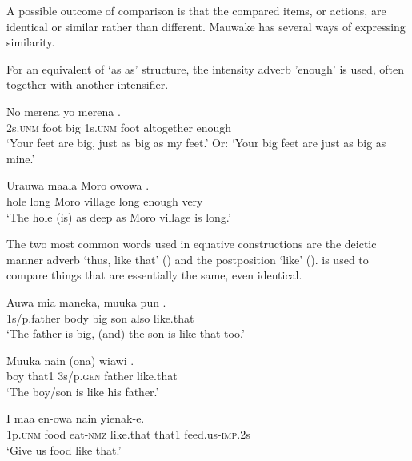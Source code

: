 A possible outcome of comparison is that the compared items, or actions, are identical or similar rather than different. Mauwake has several ways of expressing similarity. 

For an equivalent of  `as  as' structure, the intensity adverb  'enough' is used, often together with another intensifier.

\ea%
\label{ex:6:x1331}
\gll No  merena    yo  merena    . \\
2s.\textsc{unm}  foot  big  1s.\textsc{unm}  foot  altogether  enough\\
\glt `Your feet are big, just as big as my feet.' Or: `Your big feet are just as big as mine.'
\z

\ea%
\label{ex:6:x1332}
\gll Urauwa  maala  Moro  owowa      . \\
hole  long  Moro  village  long  enough  very\\
\glt `The hole (is) as deep as Moro village is long.'
\z

The two most common words used in equative constructions are the deictic manner adverb  `thus, like that' () and the postposition  `like' ().  is used to compare things that are essentially the same, even identical.

\ea%
\label{ex:6:x1338}
\gll Auwa  mia  maneka,  muuka  pun  . \\
1s/p.father  body  big  son  also  like.that\\
\glt `The father is big, (and) the son is like that too.'
\z

\ea%
\label{ex:6:x1339}
\gll Muuka  nain  (ona)  wiawi  . \\
boy  that1  3s/p.\textsc{gen}  father  like.that\\
\glt `The boy/son is like his father.'
\z

\ea%
\label{ex:6:x1348}
\gll I  maa  en-owa    nain  yienak-e. \\
1p.\textsc{unm}  food  eat-\textsc{nmz}  like.that  that1  feed.us-\textsc{imp}.2s\\
\glt `Give us food like that.'
\z

